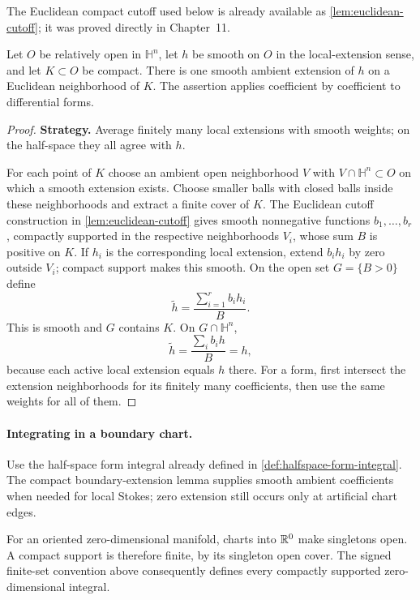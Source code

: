 The Euclidean compact cutoff used below is already available as
\cref{lem:euclidean-cutoff}; it was proved directly in Chapter~11.

\begin{lemma}
\label{lem:compact-boundary-extension}
Let $O$ be relatively open in $\mathbb H^n$, let $h$ be smooth on $O$
in the local-extension sense, and let $K\subset O$ be compact. There is
one smooth ambient extension of $h$ on a Euclidean neighborhood of $K$.
The assertion applies coefficient by coefficient to differential forms.
\end{lemma}
\begin{proof}
\textbf{Strategy.} Average finitely many local extensions with smooth
weights; on the half-space they all agree with $h$.

For each point of $K$ choose an ambient open neighborhood $V$ with
$V\cap\mathbb H^n\subset O$ on which a smooth extension exists. Choose
smaller balls with closed balls inside these neighborhoods and extract a
finite cover of $K$. The Euclidean cutoff construction in \cref{lem:euclidean-cutoff}
gives smooth nonnegative functions $b_1,\ldots,b_r$, compactly supported
in the respective neighborhoods $V_i$, whose sum $B$ is positive on $K$.
If $h_i$ is the corresponding local extension, extend $b_i h_i$ by zero
outside $V_i$; compact support makes this smooth. On the open set
$G=\{B>0\}$ define
\[
\widetilde h=\frac{\sum_{i=1}^r b_i h_i}{B}.
\]
This is smooth and $G$ contains $K$. On $G\cap\mathbb H^n$,
\[
\widetilde h=\frac{\sum_i b_i h}{B}=h,
\]
because each active local extension equals $h$ there. For a form,
first intersect the extension neighborhoods for its finitely many
coefficients, then use the same weights for all of them.
\end{proof}

\paragraph{Integrating in a boundary chart.}
Use the half-space form integral already defined in
\cref{def:halfspace-form-integral}. The compact boundary-extension lemma
supplies smooth ambient coefficients when needed for local Stokes;
zero extension still occurs only at artificial chart edges.

For an oriented zero-dimensional manifold, charts into $\mathbb{R}^0$ make
singletons open. A compact support is therefore finite, by its singleton
open cover. The signed finite-set convention above consequently defines
every compactly supported zero-dimensional integral.

